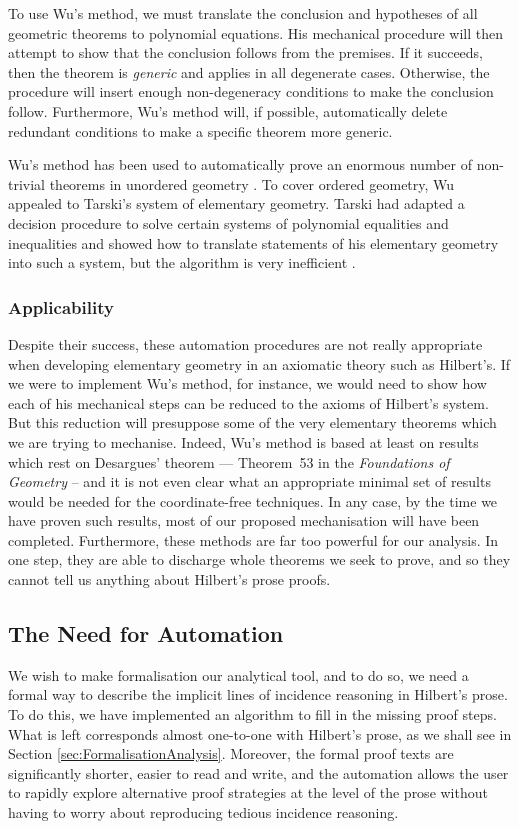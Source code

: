 To use Wu's method, we must translate the conclusion and hypotheses of all geometric theorems to polynomial equations. His mechanical procedure will then attempt to show that the conclusion follows from the premises. If it succeeds, then the theorem is \emph{generic} and applies in all degenerate cases. Otherwise, the procedure will insert enough non-degeneracy conditions to make the conclusion follow. Furthermore, Wu's method will, if possible, automatically delete redundant conditions to make a specific theorem more generic. 

Wu's method has been used to automatically prove an enormous number of non-trivial theorems in unordered geometry \cite{MechanicalGeometryTheoremProving}. To cover ordered geometry, Wu appealed to Tarski's system of elementary geometry. Tarski had adapted a decision procedure to solve certain systems of polynomial equalities and inequalities and showed how to translate statements of his elementary geometry into such a system, but the algorithm is very inefficient \cite{TarksiMcNaugtonReview}.

\subsubsection{Applicability}
Despite their success, these automation procedures are not really appropriate when developing elementary geometry in an axiomatic theory such as Hilbert's. If we were to implement Wu's method, for instance, we would need to show how each of his mechanical steps can be reduced to the axioms of Hilbert's system. But this reduction will presuppose some of the very elementary theorems which we are trying to mechanise. Indeed, Wu's method is based at least on results which rest on Desargues' theorem --- Theorem~53 in the \emph{Foundations of Geometry} -- and it is not even clear what an appropriate minimal set of results would be needed for the coordinate-free techniques. In any case, by the time we have proven such results, most of our proposed mechanisation will have been completed. Furthermore, these methods are far too powerful for our analysis. In one step, they are able to discharge whole theorems we seek to prove, and so they cannot tell us anything about Hilbert's prose proofs.

\subsection{The Need for Automation}
We wish to make formalisation our analytical tool, and to do so, we need a formal way to describe the implicit lines of incidence reasoning in Hilbert's prose. To do this, we have implemented an algorithm to fill in the missing proof steps. What is left corresponds almost one-to-one with Hilbert's prose, as we shall see in Section \ref{sec:FormalisationAnalysis}. Moreover, the formal proof texts are significantly shorter, easier to read and write, and the automation allows the user to rapidly explore alternative proof strategies at the level of the prose without having to worry about reproducing tedious incidence reasoning. 


